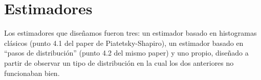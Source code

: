 \section{Estimadores}
Los estimadores que diseñamos fueron tres: un estimador basado en histogramas clásicos (punto 4.1 del paper de Piatetsky-Shapiro), un estimador basado en ``pasos de distribución'' (punto 4.2 del mismo paper) y uno propio, diseñado a partir de observar un tipo de distribución en la cual los dos anteriores no funcionaban bien.





